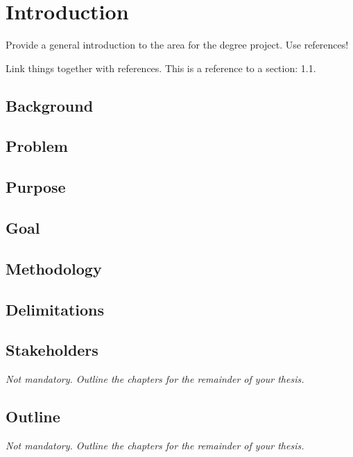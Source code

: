 \chapter{Introduction}

Provide a general introduction to the area for the degree project. Use references!

Link things together with references. This is a reference to a section: 1.1.

\lipsum[1]

\section{Background}

\lipsum[2-3]

\section{Problem}

\lipsum[4]

\section{Purpose}

\lipsum[5]

\section{Goal}

\lipsum[6]

\section{Methodology}

\lipsum[7]

\section{Delimitations}

\lipsum[8]

\section{Stakeholders}

\emph{Not mandatory. Outline the chapters for the remainder of your thesis.}

\lipsum[9]

\section{Outline}

\emph{Not mandatory. Outline the chapters for the remainder of your thesis.}

\lipsum[10]